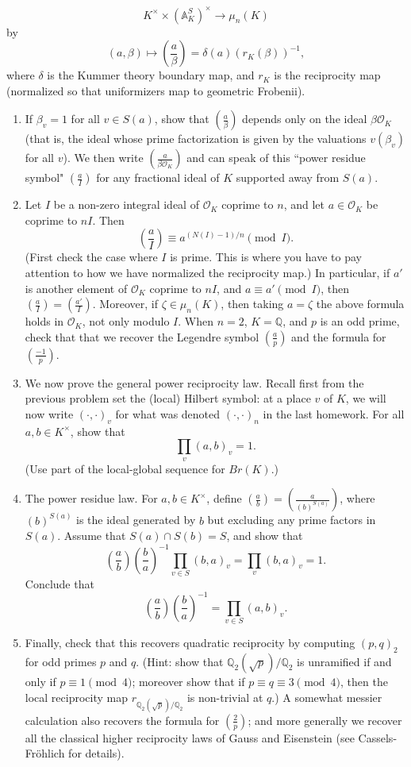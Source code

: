 \documentclass[11pt,answers,addpoints,reqno]{exam}
\theoremstyle{definition}
\theoremstyle{remark}
\theoremstyle{definition}
\theoremstyle{remark}
\theoremstyle{remark}
\theoremstyle{remark}
\newcommand{\Q}{\mathbb{Q}}
\newcommand{\mc}{\mathcal}
\begin{document}
\begin{enumerate}
\[
K^{\times} \times (\mathbb{A}_K^{S})^\times \to \mu_n(K)
\]
by
\[
(a, \beta) \mapsto \left( \frac{a}{\beta} \right)= \delta(a)(r_K(\beta))^{-1},
\]
where $\delta$ is the Kummer theory boundary map, and $r_K$ is the reciprocity map (normalized so that uniformizers map to geometric Frobenii).
\begin{enumerate}
\item If $\beta_v=1$ for all $v \in S(a)$, show that $\left( \frac{a}{\beta} \right)$ depends only on the ideal $\beta \mc{O}_K$ (that is, the ideal whose prime factorization is given by the valuations $v(\beta_v)$ for all $v$). We then write $\left( \frac{a}{\beta \mc{O}_K} \right)$ and can speak of this ``power residue symbol" $\left( \frac{a}{I} \right)$ for any fractional ideal of $K$ supported away from $S(a)$.
\item Let $I$ be a non-zero integral ideal of $\mc{O}_K$ coprime to $n$, and let $a \in \mc{O}_K$ be coprime to $nI$. Then 
\[
\left( \frac{a}{I} \right) \equiv a^{(N(I)-1)/n} \pmod I.
\]
(First check the case where $I$ is prime. This is where you have to pay attention to how we have normalized the reciprocity map.) In particular, if $a'$ is another element of $\mc{O}_K$ coprime to $nI$, and $a \equiv a' \pmod I$, then $\left( \frac{a}{I} \right)= \left( \frac{a'}{I} \right)$. Moreover, if $\zeta \in \mu_n(K)$, then taking $a= \zeta$ the above formula holds in $\mc{O}_K$, not only modulo $I$. When $n=2$, $K=\Q$, and $p$ is an odd prime, check that that we recover the Legendre symbol $\left( \frac{a}{p} \right)$ and the formula for $\left( \frac{-1}{p} \right)$. 
\item We now prove the general power reciprocity law. Recall first from the previous problem set the (local) Hilbert symbol: at a place $v$ of $K$, we will now write $(\cdot, \cdot)_v$ for what was denoted $(\cdot, \cdot)_n$ in the last homework. For all $a, b \in K^\times$, show that
\[
\prod_v (a, b)_v =1.
\]
(Use part of the local-global sequence for $Br(K)$.)
\item The power residue law. For $a, b \in K^\times$, define $\left( \frac{a}{b} \right)= \left( \frac{a}{(b)^{S(a)}} \right)$, where $(b)^{S(a)}$ is the ideal generated by $b$ but excluding any prime factors in $S(a)$. Assume that $S(a) \cap S(b)=S$, and show that
\[
\left( \frac{a}{b} \right) \left( \frac{b}{a} \right)^{-1} \prod_{v \in S} (b, a)_v= \prod_v (b,a)_v =1.
\]
Conclude that
\[
\left( \frac{a}{b} \right) \left( \frac{b}{a} \right)^{-1}= \prod_{v \in S} (a, b)_v.
\]
\item Finally, check that this recovers quadratic reciprocity by computing $(p, q)_2$ for odd primes $p$ and $q$. (Hint: show that $\Q_2(\sqrt{p})/\Q_2$ is unramified if and only if $p \equiv 1 \pmod 4$; moreover show that if $p \equiv q \equiv 3 \pmod 4$, then the local reciprocity map $r_{\Q_2(\sqrt{p})/\Q_2}$ is non-trivial at $q$.) A somewhat messier calculation also recovers the formula for $\left( \frac{2}{p} \right)$; and more generally we recover all the classical higher reciprocity laws of Gauss and Eisenstein (see Cassels-Fr\"{o}hlich for details).

\end{enumerate}
\end{enumerate}
\end{document}
